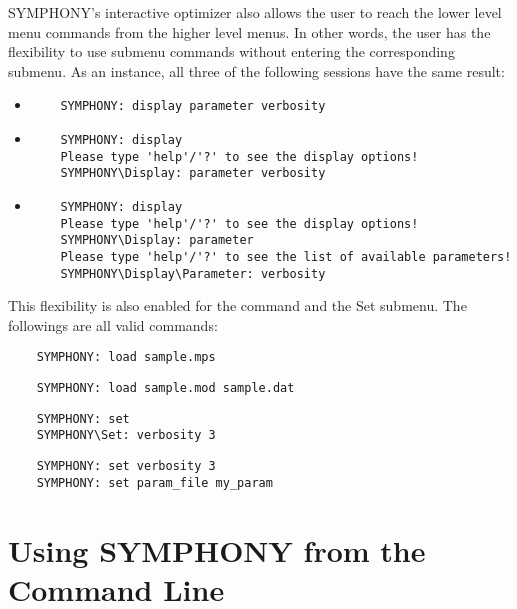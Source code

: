 SYMPHONY's interactive optimizer also allows the user to reach the lower 
level menu commands from the higher level menus. In other words, the user 
has the flexibility to use submenu commands without entering the 
corresponding submenu. As an instance, all three of the following sessions 
have the same result: 
{\color{Brown}
\begin{itemize}
\item 
  \begin{verbatim}
    SYMPHONY: display parameter verbosity
  \end{verbatim}
\item 
  \begin{verbatim}
    SYMPHONY: display
    Please type 'help'/'?' to see the display options!
    SYMPHONY\Display: parameter verbosity
  \end{verbatim}
\item 
  \begin{verbatim}
    SYMPHONY: display
    Please type 'help'/'?' to see the display options!
    SYMPHONY\Display: parameter
    Please type 'help'/'?' to see the list of available parameters!
    SYMPHONY\Display\Parameter: verbosity
  \end{verbatim}
\end{itemize}
}
This flexibility is also enabled for the  command and the Set 
submenu. The followings are all valid commands: 
{\color{Brown}
  \begin{verbatim}
    SYMPHONY: load sample.mps
  \end{verbatim}
  \begin{verbatim}
    SYMPHONY: load sample.mod sample.dat
  \end{verbatim}
  \begin{verbatim}
    SYMPHONY: set
    SYMPHONY\Set: verbosity 3
  \end{verbatim}
  \begin{verbatim}
    SYMPHONY: set verbosity 3
    SYMPHONY: set param_file my_param
  \end{verbatim}
}

\section{Using SYMPHONY from the Command Line}

